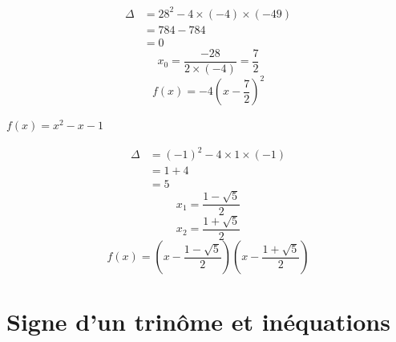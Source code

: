 \documentclass[11pt,a4paper]{article}  %
\begin{document}
\begin{enumMet}
	\begin{corrBox}
		\begin{align*}
			\Delta &= 28^2 - 4 \times (-4) \times (-49) \\
			&= 784 - 784 \\
			&= 0
		\end{align*}
		\[
		x_0 = \frac{-28}{2 \times (-4)} = \frac{7}{2}
		\]
		\[
		f(x) = -4\left(x - \frac{7}{2}\right)^2
		\]	
	\end{corrBox}
	\item $f(x)=x^2-x-1$
	\begin{corrBox}
		\begin{align*}
			\Delta &= (-1)^2 - 4 \times 1 \times (-1) \\
			&= 1 + 4 \\
			&= 5
		\end{align*}
		\[
		x_1 = \frac{1 - \sqrt{5}}{2}
		\]
		\[
		x_2 = \frac{1 + \sqrt{5}}{2}
		\]
		\[
		f(x) = \left(x - \frac{1 - \sqrt{5}}{2}\right)\left(x - \frac{1 + \sqrt{5}}{2}\right)
		\]		
	\end{corrBox}
\end{enumMet}



\section*{Signe d'un trinôme et inéquations}

\exercice{}
\end{document}
